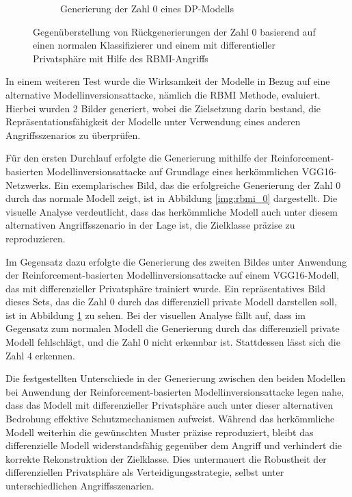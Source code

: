 \begin{figure}[H]
\begin{subfigure}[b]{0.35\linewidth}
		\caption{Generierung der Zahl 0 eines DP-Modells}
		\label{img:rbmi_0_dp}
	\end{subfigure}
	\caption{Gegenüberstellung von Rückgenerierungen der Zahl 0 basierend auf einen normalen Klassifizierer und einem mit differentieller Privatsphäre mit Hilfe des \glqq RBMI\grqq-Angriffs}
	\label{img:rbmi_dpvsnorm}
\end{figure}

In einem weiteren Test wurde die Wirksamkeit der Modelle in Bezug auf eine alternative Modellinversionsattacke, nämlich die RBMI Methode, evaluiert. Hierbei wurden 2 Bilder generiert, wobei die Zielsetzung darin bestand, die Repräsentationsfähigkeit der Modelle unter Verwendung eines anderen Angriffsszenarios zu überprüfen.

Für den ersten Durchlauf erfolgte die Generierung mithilfe der Reinforcement-basierten Modellinversionsattacke auf Grundlage eines herkömmlichen VGG16-Netzwerks. Ein exemplarisches Bild, das die erfolgreiche Generierung der Zahl 0 durch das normale Modell zeigt, ist in Abbildung \ref{img:rbmi_0} dargestellt. Die visuelle Analyse verdeutlicht, dass das herkömmliche Modell auch unter diesem alternativen Angriffsszenario in der Lage ist, die Zielklasse präzise zu reproduzieren.

Im Gegensatz dazu erfolgte die Generierung des zweiten Bildes unter Anwendung der Reinforcement-basierten Modellinversionsattacke auf einem VGG16-Modell, das mit differenzieller Privatsphäre trainiert wurde. Ein repräsentatives Bild dieses Sets, das die Zahl 0 durch das differenziell private Modell darstellen soll, ist in Abbildung \ref{img:rbmi_0_dp} zu sehen. Bei der visuellen Analyse fällt auf, dass im Gegensatz zum normalen Modell die Generierung durch das differenziell private Modell fehlschlägt, und die Zahl 0 nicht erkennbar ist. Stattdessen lässt sich die Zahl 4 erkennen.

Die festgestellten Unterschiede in der Generierung zwischen den beiden Modellen bei Anwendung der Reinforcement-basierten Modellinversionsattacke legen nahe, dass das Modell mit differenzieller Privatsphäre auch unter dieser alternativen Bedrohung effektive Schutzmechanismen aufweist. Während das herkömmliche Modell weiterhin die gewünschten Muster präzise reproduziert, bleibt das differenzielle Modell widerstandsfähig gegenüber dem Angriff und verhindert die korrekte Rekonstruktion der Zielklasse. Dies untermauert die Robustheit der differenziellen Privatsphäre als Verteidigungsstrategie, selbst unter unterschiedlichen Angriffsszenarien.

